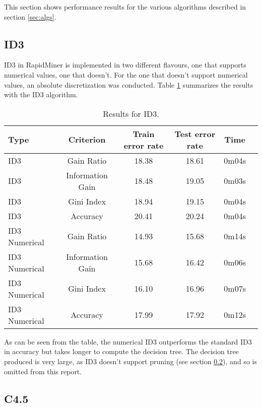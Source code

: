 \documentclass[a4paper]{llncs}
\begin{document}
This section shows performance results for the various algorithms described in section \ref{sec:algs}.

\subsection{ID3}

ID3 in RapidMiner is implemented in two different flavours, one that supports
numerical values, one that doesn't. For the one that doesn't support numerical
values, an absolute discretization was conducted. Table \ref{tbl:results_id3}
summarizes the results with the ID3 algorithm.

\begin{table}
  \begin{center}
  \begin{tabular}{ | l | c | c | c | c | c |}
    \hline
    \textbf{Type} & \textbf{Criterion} & \textbf{Train error rate} & \textbf{Test error rate} & \textbf{Time} \\ \hline
    ID3 & Gain Ratio & 18.38 & 18.61 & 0m04s \\ \hline
    ID3 & Information Gain & 18.48 & 19.05 & 0m03s \\ \hline
    ID3 & Gini Index & 18.94 & 19.15 & 0m04s \\ \hline
    ID3 & Accuracy & 20.41 & 20.24 & 0m04s \\ \hline
    ID3 Numerical & Gain Ratio & 14.93 & 15.68 & 0m14s \\ \hline
    ID3 Numerical & Information Gain & 15.68 & 16.42 & 0m06s \\ \hline
    ID3 Numerical & Gini Index & 16.10 & 16.96 & 0m07s \\ \hline
    ID3 Numerical & Accuracy & 17.99 & 17.92 & 0m12s \\ \hline
  \end{tabular}
  \caption{Results for ID3.}
  \label{tbl:results_id3}
  \end{center}
\end{table}

As can be seen from the table, the numerical ID3 outperforms the standard ID3 in
accuracy but takes longer to compute the decision tree. The decision tree
produced is very large, as ID3 doesn't support pruning (see section 
\ref{sec:c4.5}), and so is omitted from this report.

\subsection{C4.5}
\label{sec:c4.5}
\end{document}
